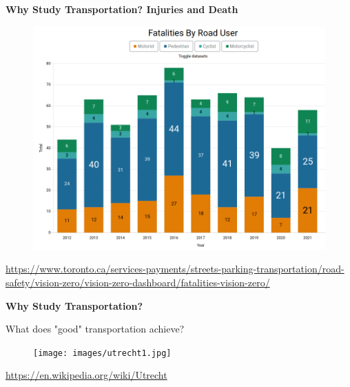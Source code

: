 \documentclass[aspectratio=169]{beamer}
\begin{document}
\begin{frame}
	\textbf{Why Study Transportation? Injuries and Death}
	\begin{figure}
		\centering
		\includegraphics[width=0.7\linewidth]{images/vision_zero_deaths.png}
	\end{figure}
	\tiny\url{https://www.toronto.ca/services-payments/streets-parking-transportation/road-safety/vision-zero/vision-zero-dashboard/fatalities-vision-zero/}
\end{frame}





\begin{frame}
	\textbf{Why Study Transportation?}
	
	\vspace{4mm}
	
	What does "good" transportation achieve?
	
	\begin{figure}
		\centering
		\texttt{[image: images/utrecht1.jpg]}
	\end{figure}
	\tiny\url{https://en.wikipedia.org/wiki/Utrecht}
	
\end{frame}

\end{document}
